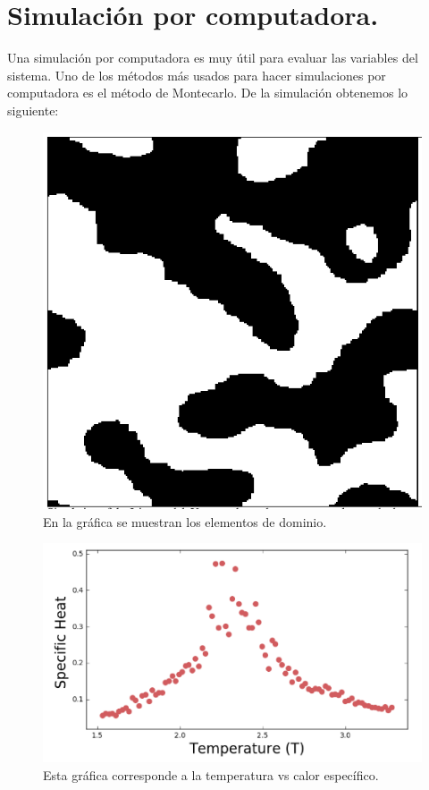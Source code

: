 \documentclass[letterpaper,12pt,oneside]{book}
\begin{document}
\section{Simulaci\'on por computadora.}
Una simulaci\'on por computadora es muy \'util para evaluar las variables del sistema. Uno de los m\'etodos m\'as usados para hacer simulaciones por computadora es el m\'etodo de Montecarlo. 
De la simulaci\'on obtenemos lo siguiente:
%
\begin{figure}
\centering
\includegraphics[scale=0.75]{fig/elementosDeDominio.png}
\caption{\label{elemDom}  En la gr\'afica se muestran los elementos de dominio.}
\end{figure}
% 
\begin{figure}
\centering
\includegraphics[scale=0.75]{fig/temperaturaVsCalorEspecifico.png}
\caption{\label{tempVsCe}  Esta gr\'afica corresponde a la temperatura vs calor espec\'ifico.}
\end{figure}
\end{document}
